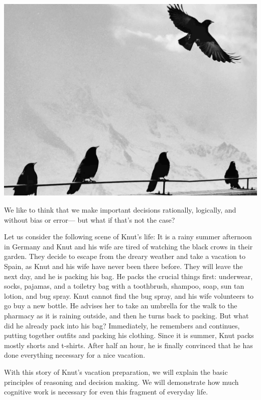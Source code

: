 \documentclass[
]{krantz}
\begin{document}
\begin{center}\includegraphics[width=1\linewidth]{images/ch9/fig0} \end{center}

We like to think that we make important decisions rationally, logically, and without bias or error--- but what if that's not the case?

Let us consider the following scene of Knut's life: It is a rainy summer afternoon in Germany and Knut and his wife are tired of watching the black crows in their garden. They decide to escape from the dreary weather and take a vacation to Spain, as Knut and his wife have never been there before. They will leave the next day, and he is packing his bag. He packs the crucial things first: underwear, socks, pajamas, and a toiletry bag with a toothbrush, shampoo, soap, sun tan lotion, and bug spray. Knut cannot find the bug spray, and his wife volunteers to go buy a new bottle. He advises her to take an umbrella for the walk to the pharmacy as it is raining outside, and then he turns back to packing. But what did he already pack into his bag? Immediately, he remembers and continues, putting together outfits and packing his clothing. Since it is summer, Knut packs mostly shorts and t-shirts. After half an hour, he is finally convinced that he has done everything necessary for a nice vacation.

With this story of Knut's vacation preparation, we will explain the basic principles of reasoning and decision making. We will demonstrate how much cognitive work is necessary for even this fragment of everyday life.
\end{document}

